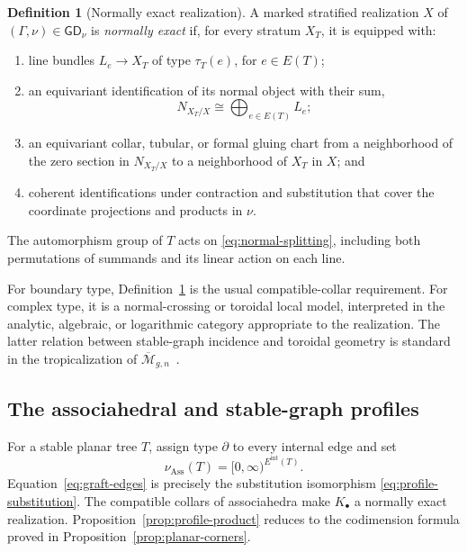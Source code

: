\documentclass[11pt,letterpaper,twoside]{article}
\theoremstyle{plain}
\theoremstyle{definition}
\newtheorem{definition}[theorem]{Definition}
\theoremstyle{remark}
\let\cite\citep
\newcommand{\LGrm}{\mathsf{GD}_{\nu}}
\begin{document}
\begin{definition}[Normally exact realization]\label{def:normal-exact}
A marked stratified realization \(X\) of \((\Gamma,\nu)\in\LGrm\) is \emph{normally exact} if, for every stratum \(X_T\), it is equipped with:
\begin{enumerate}
\item line bundles \(L_e\to X_T\) of type \(\tau_T(e)\), for \(e\in E(T)\);
\item an equivariant identification of its normal object with their sum,
\begin{equation}\label{eq:normal-splitting}
 N_{X_T/X}\cong\bigoplus_{e\in E(T)}L_e;
\end{equation}
\item an equivariant collar, tubular, or formal gluing chart from a neighborhood of the zero section in \(N_{X_T/X}\) to a neighborhood of \(X_T\) in \(X\); and
\item coherent identifications under contraction and substitution that cover the coordinate projections and products in \(\nu\).
\end{enumerate}
The automorphism group of \(T\) acts on \eqref{eq:normal-splitting}, including both permutations of summands and its linear action on each line.
\end{definition}

For boundary type, Definition~\ref{def:normal-exact} is the usual compatible-collar requirement.  For complex type, it is a normal-crossing or toroidal local model, interpreted in the analytic, algebraic, or logarithmic category appropriate to the realization.  The latter relation between stable-graph incidence and toroidal geometry is standard in the tropicalization of \(\overline{\mathcal M}_{g,n}\)~\cite{abramovich2015}.

\subsection{The associahedral and stable-graph profiles}

For a stable planar tree \(T\), assign type \(\partial\) to every internal edge and set
\[
 \nu_{\mathrm{Ass}}(T)=[0,\infty)^{E^{\mathrm{int}}(T)}.
\]
Equation~\eqref{eq:graft-edges} is precisely the substitution isomorphism \eqref{eq:profile-substitution}.  The compatible collars of associahedra make \(K_\bullet\) a normally exact realization.  Proposition~\ref{prop:profile-product} reduces to the codimension formula proved in Proposition~\ref{prop:planar-corners}.
\end{document}

